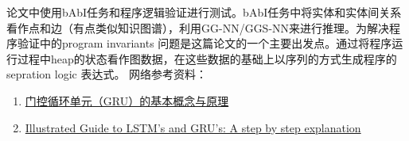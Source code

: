 \par 论文中使用bAbI任务和程序逻辑验证进行测试。bAbI任务中将实体和实体间关系看作点和边（有点类似知识图谱），利用GG-NN/GGS-NN来进行推理。为解决程序验证中的program invariants 问题是这篇论文的一个主要出发点。通过将程序运行过程中heap的状态看作图数据，在这些数据的基础上以序列的方式生成程序的sepration logic\cite{10.1007/3-540-44802-0_1} 表达式。
\newline
网络参考资料：
\begin{enumerate}
    \item \href{https://www.jiqizhixin.com/articles/2017-12-24}{门控循环单元（GRU）的基本概念与原理}
    \item \href{https://towardsdatascience.com/illustrated-guide-to-lstms-and-gru-s-a-step-by-step-explanation-44e9eb85bf21}{Illustrated Guide to LSTM’s and GRU’s: A step by step explanation}
\end{enumerate}




